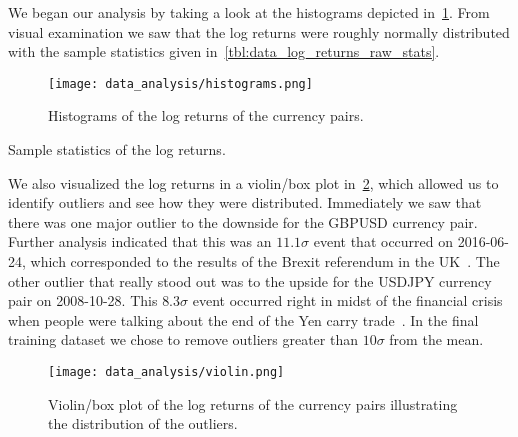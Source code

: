 We began our analysis by taking a look at the histograms depicted in~\cref{fig:histograms_raw}.
From visual examination we saw that the log returns were roughly normally distributed with the sample statistics given in~\cref{tbl:data_log_returns_raw_stats}.
\begin{figure}[!htb]
    \begin{center}
        \texttt{[image: data\_analysis/histograms.png]}
    \end{center}
    \caption{Histograms of the log returns of the currency pairs.}
    \label{fig:histograms_raw}
\end{figure}

\begin{table}[!htb]
    \centering
    \begin{adjustbox}{max width=\textwidth}
        
    \end{adjustbox}
    \caption{Sample statistics of the log returns.}
    \label{tbl:data_log_returns_raw_stats}
\end{table}

We also visualized the log returns in a violin/box plot in~\cref{fig:violin_raw}, which allowed us to identify outliers and see how they were distributed.
Immediately we saw that there was one major outlier to the downside for the GBPUSD currency pair.
Further analysis indicated that this was an \( 11.1\sigma \) event that occurred on 2016-06-24, which corresponded to the results of the Brexit referendum in the UK~\cite{brexit_gov_uk}.
The other outlier that really stood out was to the upside for the USDJPY currency pair on 2008-10-28.
This \( 8.3\sigma \) event occurred right in midst of the financial crisis when people were talking about the end of the Yen carry trade~\cite{jpy_carry_trade_nyt}.
In the final training dataset we chose to remove outliers greater than \( 10\sigma \) from the mean.
\begin{figure}[!htb]
    \begin{center}
        \texttt{[image: data\_analysis/violin.png]}
    \end{center}
    \caption{Violin/box plot of the log returns of the currency pairs illustrating the distribution of the outliers.}
    \label{fig:violin_raw}
\end{figure}

